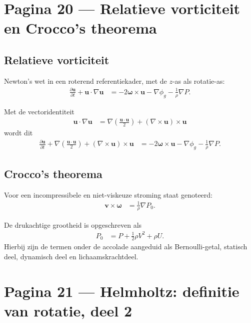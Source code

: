 \documentclass[11pt]{article}
\newcommand{\pd}[2]{\frac{\partial #1}{\partial #2}}
\newcommand{\vect}[1]{\mathbf{#1}}
\begin{document}
\newpage

\section*{Pagina 20 --- Relatieve vorticiteit en Crocco's theorema}

\subsection*{Relatieve vorticiteit}

Newton's wet in een roterend referentiekader, met de $z$-as als rotatie-as:
\begin{align*}
\pd{\vect{u}}{t}
+\vect{u}\cdot\nabla\vect{u}
&=
-2\bm{\omega}\times\vect{u}
-\nabla\phi_g
-\frac{1}{\rho}\nabla P .
\end{align*}

Met de vectoridentiteit
\begin{align*}
\vect{u}\cdot\nabla\vect{u}
  &=
  \nabla\left(\frac{\vect{u}\cdot\vect{u}}{2}\right)
  +\left(\nabla\times\vect{u}\right)\times\vect{u}
\end{align*}
wordt dit
\begin{align*}
\pd{\vect{u}}{t}
+\nabla\left(\frac{\vect{u}\cdot\vect{u}}{2}\right)
+\left(\nabla\times\vect{u}\right)\times\vect{u}
&=
-2\bm{\omega}\times\vect{u}
-\nabla\phi_g
-\frac{1}{\rho}\nabla P .
\end{align*}

\subsection*{Crocco's theorema}

Voor een incompressibele en niet-viskeuze stroming staat genoteerd:
\begin{align*}
\vect{v}\times\bm{\omega}
  &=
  \frac{1}{\rho}\nabla P_0 .
\end{align*}

De drukachtige grootheid is opgeschreven als
\begin{align*}
P_0
  &=
  P+\frac{1}{2}\rho V^2+\rho U .
\end{align*}
Hierbij zijn de termen onder de accolade aangeduid als Bernoulli-getal, statisch deel, dynamisch deel en lichaamskrachtdeel.

\newpage

\section*{Pagina 21 --- Helmholtz: definitie van rotatie, deel 2}
\end{document}
